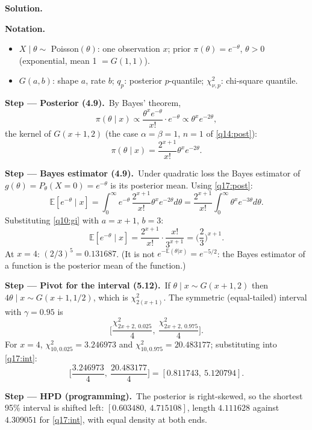 \documentclass[11pt,a4paper]{article}
\numberwithin{equation}{questao}   %
\newenvironment{notacao}{\par\smallskip\noindent\textbf{Notation.}\begin{itemize}[leftmargin=1.4em,topsep=1pt,itemsep=0pt]\small}{\end{itemize}}
\newcommand{\passo}[2]{\par\smallskip\noindent\textbf{Step --- #1.}~#2}
\newcommand{\solhead}{\par\medskip\noindent{\color{blue!55!black}\rule{\linewidth}{0.3pt}}\par\noindent\textbf{Solution.}}
\newcommand{\E}{\mathbb{E}}
\newcommand{\1}{\mathbf{1}}
\begin{document}
\begin{sol}
\solhead
\begin{notacao}
\item $X\mid\theta\sim$ Poisson$(\theta)$: one observation $x$; prior $\pi(\theta)=e^{-\theta}$, $\theta>0$ (exponential, mean 1 $=G(1,1)$).
\item $G(a,b)$: shape $a$, rate $b$; $q_p$: posterior $p$-quantile; $\chi^2_{\nu,p}$: chi-square quantile.
\end{notacao}

\passo{Posterior (4.9)}{By Bayes' theorem,}
\begin{equation}\label{q17:post0}
\pi(\theta\mid x)\propto\frac{\theta^xe^{-\theta}}{x!}\cdot e^{-\theta}\propto\theta^{x}e^{-2\theta},
\end{equation}
the kernel of $G(x+1,2)$ (the case $\alpha=\beta=1$, $n=1$ of \eqref{q14:post}):
\begin{equation}\label{q17:post}
\pi(\theta\mid x)=\frac{2^{x+1}}{x!}\theta^xe^{-2\theta}.
\end{equation}

\passo{Bayes estimator (4.9)}{Under quadratic loss the Bayes estimator of $g(\theta)=P_\theta(X=0)=e^{-\theta}$
is its posterior mean. Using \eqref{q17:post}:}
\[
\E[e^{-\theta}\mid x]=\int_0^\infty e^{-\theta}\,\frac{2^{x+1}}{x!}\theta^xe^{-2\theta}d\theta=\frac{2^{x+1}}{x!}\int_0^\infty\theta^xe^{-3\theta}d\theta .
\]
Substituting \eqref{q10:gi} with $a=x+1$, $b=3$:
\begin{equation}\label{q17:bayes}
\E[e^{-\theta}\mid x]=\frac{2^{x+1}}{x!}\cdot\frac{x!}{3^{x+1}}=\Big(\frac23\Big)^{x+1}.
\end{equation}
At $x=4$: $(2/3)^5=0.131687$. (It is not $e^{-\E(\theta|x)}=e^{-5/2}$: the Bayes estimator of a
function is the posterior mean of the function.)

\passo{Pivot for the interval (5.12)}{If $\theta\mid x\sim G(x+1,2)$ then $4\theta\mid x\sim G(x+1,1/2)$,
which is $\chi^2_{2(x+1)}$. The symmetric (equal-tailed) interval with $\gamma=0.95$ is}
\begin{equation}\label{q17:int}
\Big[\frac{\chi^2_{2x+2,\,0.025}}{4},\ \frac{\chi^2_{2x+2,\,0.975}}{4}\Big].
\end{equation}
For $x=4$, $\chi^2_{10,0.025}=3.246973$ and $\chi^2_{10,0.975}=20.483177$; substituting into
\eqref{q17:int}:
\[
\Big[\frac{3.246973}{4},\ \frac{20.483177}{4}\Big]=[0.811743,\ 5.120794].
\]

\passo{HPD (programming)}{The posterior is right-skewed, so the shortest 95\% interval is shifted
left: $[0.603480,\ 4.715108]$, length $4.111628$ against $4.309051$ for \eqref{q17:int}, with equal
density at both ends.}


\end{sol}
\end{document}
